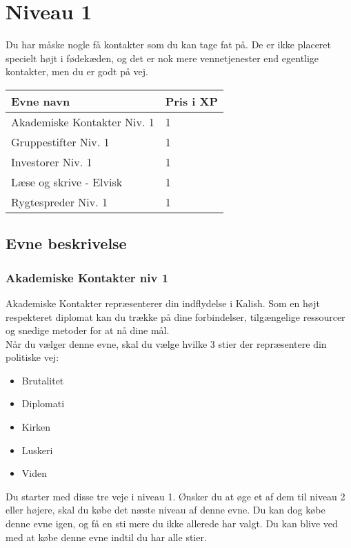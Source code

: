 \chapter*{Niveau 1}
Du har måske nogle få kontakter som du kan tage fat på. De er ikke placeret specielt højt i fødekæden, og det er nok mere vennetjenester end egentlige kontakter, men du er godt på vej.
\begin{table}[H]
    \centering
    \begin{tabular}{|p{}|p{}|}
    \rowcolor{cerulean!80}\hline
        Evne navn & Pris i XP \\\hline
         Akademiske Kontakter Niv. 1 & 1 \\\hline
         Gruppestifter Niv. 1 & 1 \\\hline
         Investorer Niv. 1 & 1\\\hline
         Læse og skrive - Elvisk & 1\\\hline
         Rygtespreder Niv. 1 & 1 \\
         \hline
    \end{tabular}
\end{table}


\section*{Evne beskrivelse}

\subsection*{Akademiske Kontakter niv 1}

Akademiske Kontakter repræsenterer din indflydelse i Kalish. Som en højt respekteret diplomat kan du trække på dine forbindelser, tilgængelige ressourcer og snedige metoder for at nå dine mål.\\
Når du vælger denne evne, skal du vælge hvilke 3 stier der repræsentere din politiske vej:
\begin{itemize}    
    \item Brutalitet
    \item Diplomati
    \item Kirken
    \item Luskeri 
    \item Viden 
\end{itemize}
Du starter med disse tre veje i niveau 1. Ønsker du at øge et af dem til niveau 2 eller højere, skal du købe det næste niveau af denne evne. Du kan dog købe denne evne igen, og få en sti mere du ikke allerede har valgt. Du kan blive ved med at købe denne evne indtil du har alle stier.\\

